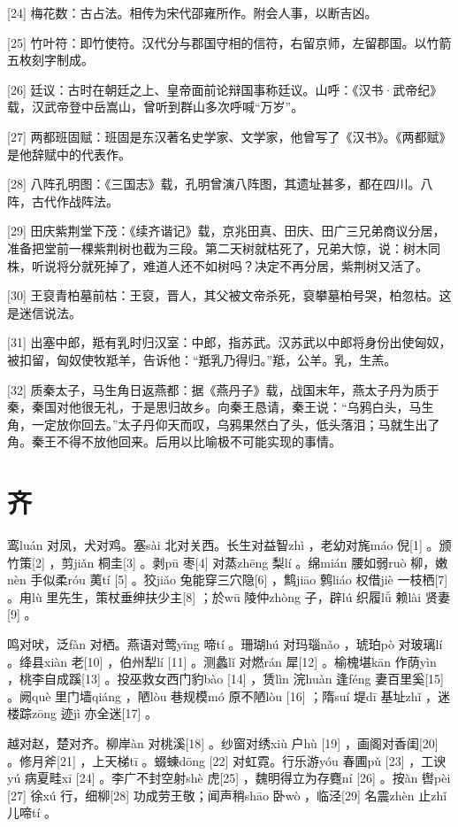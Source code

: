 \documentclass[12pt,UTF8]{ctexbook}
\begin{document}
[24] 梅花数：古占法。相传为宋代邵雍所作。附会人事，以断吉凶。

[25] 竹叶符：即竹使符。汉代分与郡国守相的信符，右留京师，左留郡国。以竹箭五枚刻字制成。

[26] 廷议：古时在朝廷之上、皇帝面前论辩国事称廷议。山呼：《汉书·武帝纪》载，汉武帝登中岳嵩山，曾听到群山多次呼喊“万岁”。

[27] 两都班固赋：班固是东汉著名史学家、文学家，他曾写了《汉书》。《两都赋》是他辞赋中的代表作。

[28] 八阵孔明图：《三国志》载，孔明曾演八阵图，其遗址甚多，都在四川。八阵，古代作战阵法。

[29] 田庆紫荆堂下茂：《续齐谐记》载，京兆田真、田庆、田广三兄弟商议分居，准备把堂前一棵紫荆树也截为三段。第二天树就枯死了，兄弟大惊，说：树木同株，听说将分就死掉了，难道人还不如树吗？决定不再分居，紫荆树又活了。

[30] 王裒青柏墓前枯：王裒，晋人，其父被文帝杀死，裒攀墓柏号哭，柏忽枯。这是迷信说法。

[31] 出塞中郎，羝有乳时归汉室：中郎，指苏武。汉苏武以中郎将身份出使匈奴，被扣留，匈奴使牧羝羊，告诉他：“羝乳乃得归。”羝，公羊。乳，生羔。

[32] 质秦太子，马生角日返燕都：据《燕丹子》载，战国末年，燕太子丹为质于秦，秦国对他很无礼，于是思归故乡。向秦王恳请，秦王说：“乌鸦白头，马生角，一定放你回去。”太子丹仰天而叹，乌鸦果然白了头，低头落泪；马就生出了角。秦王不得不放他回来。后用以比喻极不可能实现的事情。





\chapter{齐}


鸾luán 对凤，犬对鸡。塞sài 北对关西。长生对益智zhì ，老幼对旄máo 倪[1] 。颁竹策[2] ，剪jiǎn 桐圭[3] 。剥pū 枣[4] 对蒸zhēng 梨lí 。绵mián 腰如弱ruò 柳，嫩nèn 手似柔róu 荑tí [5] 。狡jiǎo 兔能穿三穴隐[6] ，鹪jiāo 鹩liáo 权借jiè 一枝栖[7] 。甪lù 里先生，策杖垂绅扶少主[8] ；於wū 陵仲zhòng 子，辟lú 织履lǚ 赖lài 贤妻[9] 。

鸣对吠，泛fàn 对栖。燕语对莺yīng 啼tí 。珊瑚hú 对玛瑙nǎo ，琥珀pò 对玻璃lí 。绛县xiàn 老[10] ，伯州犁lí [11] 。测蠡lǐ 对燃rán 犀[12] 。榆槐堪kān 作荫yìn ，桃李自成蹊[13] 。投巫救女西门豹bào [14] ，赁lìn 浣huàn 逢féng 妻百里奚[15] 。阙què 里门墙qiáng ，陋lòu 巷规模mó 原不陋lòu [16] ；隋suí 堤dī 基址zhǐ ，迷楼踪zōng 迹jì 亦全迷[17] 。

越对赵，楚对齐。柳岸àn 对桃溪[18] 。纱窗对绣xiù 户hù [19] ，画阁对香闺[20] 。修月斧[21] ，上天梯tī 。蝃蝀dōng [22] 对虹霓。行乐游yóu 春圃pǔ [23] ，工谀yú 病夏畦xī [24] 。李广不封空射shè 虎[25] ，魏明得立为存麑ní [26] 。按àn 辔pèi [27] 徐xú 行，细柳[28] 功成劳王敬；闻声稍shāo 卧wò ，临泾[29] 名震zhèn 止zhǐ 儿啼tí 。
\end{document}
